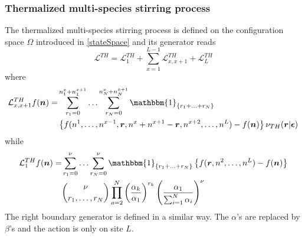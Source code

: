 \documentclass[11pt]{article}
\numberwithin{equation}{section}
\numberwithin{equation}{subsection}
\begin{document}
\subsubsection{Thermalized multi-species stirring process}
The thermalized multi-species stirring process is defined on the configuration space $\Omega$ introduced in \eqref{stateSpace} and its generator reads
\begin{equation}\label{thermalizedGenerator}
	\mathcal{L}^{TH}=\mathcal{L}_{1}^{TH}+\sum_{x=1}^{L-1}\mathcal{L}_{x,x+1}^{TH}+\mathcal{L}_{L}^{TH}
\end{equation}
where 
\begin{equation}\label{bulkThermalized}
	\begin{split}
	\mathcal{L}_{x,x+1}^{TH}f(\bm{n})=&\sum_{r_{1}=0}^{n_{1}^{x}+n_{1}^{x+1}}\ldots\sum_{r_{N}=0}^{n_{N}^{x}+n_{N}^{x+1}}\mathbbm{1}_{\{r_{1}+\ldots+r_{N}\}}
	\\&
	\left\{f(n^{1},\ldots,n^{x-1},\bm{r},n^{x}+n^{x+1}-\bm{r},n^{x+2},\ldots,n^{L})-f(\bm{n})\right\}\nu_{TH}(\bm{r}|\bm{\epsilon})
	\end{split}
\end{equation}
while
\begin{equation}\label{boundaryThermalized}
	\begin{split}
		\mathcal{L}_{1}^{TH}f(\bm{n})=&\sum_{r_{1}=0}^{\nu}\ldots\sum_{r_{N}=0}^{\nu}\mathbbm{1}_{\{r_{1}+\ldots+r_{N}\}}\left\{f(\bm{r},n^{2},\ldots,n^{L})-f(\bm{n})\right\}\\&
		\binom{\nu}{r_{1},\ldots, r_{N}}\prod_{a=2}^{N}\left(\frac{\alpha_{k}}{\alpha_{1}}\right)^{r_{k}}\left(\frac{\alpha_{1}}{\sum_{i=1}^{N}\alpha_{i}}\right)^{\nu}
		\end{split}
	\end{equation}
The right boundary generator is defined in a similar way. The $\alpha$'s are replaced by $\beta$'s and the action is only on site $L$. 
\end{document}
